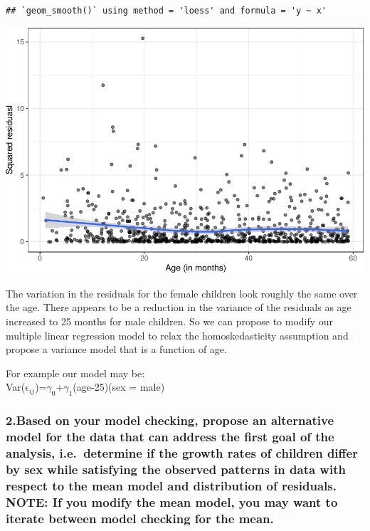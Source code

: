\documentclass[
]{article}
\begin{document}
\begin{verbatim}
## `geom_smooth()` using method = 'loess' and formula = 'y ~ x'
\end{verbatim}

\includegraphics{ProblemSet3_ts_1677791812_files/figure-latex/unnamed-chunk-11-1.pdf}

The variation in the residuals for the female children look roughly the
same over the age. There appears to be a reduction in the variance of
the residuals as age increased to 25 months for male children. So we can
propose to modify our multiple linear regression model to relax the
homoskedasticity assumption and propose a variance model that is a
function of age.

For example our model may be:\\
Var(\(\epsilon_{ij}\))=\(\gamma_0\)+\(\gamma_1\)\textbar(age-25)\textbar(sex
= male)

\hypertarget{based-on-your-model-checking-propose-an-alternative-model-for-the-data-that-can-address-the-first-goal-of-the-analysis-i.e.-determine-if-the-growth-rates-of-children-differ-by-sex-while-satisfying-the-observed-patterns-in-data-with-respect-to-the-mean-model-and-distribution-of-residuals.-note-if-you-modify-the-mean-model-you-may-want-to-iterate-between-model-checking-for-the-mean.}{%
\subsubsection{2.Based on your model checking, propose an alternative
model for the data that can address the first goal of the analysis,
i.e.~determine if the growth rates of children differ by sex while
satisfying the observed patterns in data with respect to the mean model
and distribution of residuals. NOTE: If you modify the mean model, you
may want to iterate between model checking for the
mean.}\label{based-on-your-model-checking-propose-an-alternative-model-for-the-data-that-can-address-the-first-goal-of-the-analysis-i.e.-determine-if-the-growth-rates-of-children-differ-by-sex-while-satisfying-the-observed-patterns-in-data-with-respect-to-the-mean-model-and-distribution-of-residuals.-note-if-you-modify-the-mean-model-you-may-want-to-iterate-between-model-checking-for-the-mean.}}
\end{document}

